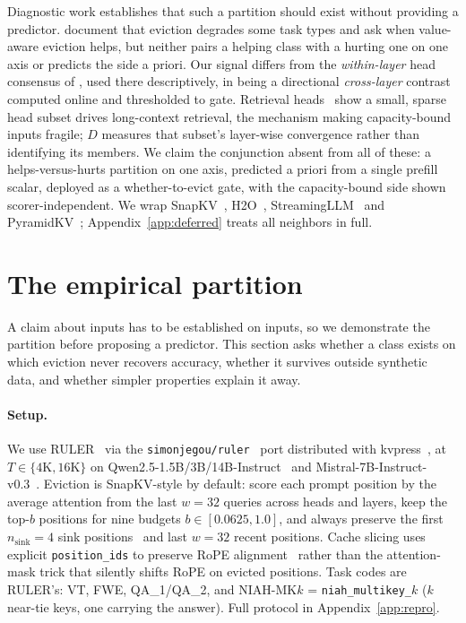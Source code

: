 \documentclass{article}
\begin{document}
Diagnostic work establishes that such a partition should exist without
providing a predictor. \citet{arxiv251000231} document that eviction degrades
some task types and \citet{arxiv260508234} ask when value-aware eviction
helps, but neither pairs a helping class with a hurting one on one axis or
predicts the side a priori. Our signal differs from the \emph{within-layer}
head consensus of \citet{arxiv260301426}, used there descriptively, in being a
directional \emph{cross-layer} contrast computed online and thresholded to
gate. Retrieval heads~\citep{wu2025retrieval} show a small, sparse head subset
drives long-context retrieval, the mechanism making capacity-bound inputs
fragile; $D$ measures that subset's layer-wise convergence rather than
identifying its members. We claim the conjunction absent from all of these: a
helps-versus-hurts partition on one axis, predicted a priori from a single
prefill scalar, deployed as a whether-to-evict gate, with the capacity-bound
side shown scorer-independent. We wrap SnapKV~\citep{arxiv240414469},
H2O~\citep{arxiv230614048}, StreamingLLM~\citep{arxiv230917453} and
PyramidKV~\citep{arxiv240602069}; Appendix~\ref{app:deferred} treats all
neighbors in full.

\section{The empirical partition}
\label{sec:partition}

A claim about inputs has to be established on inputs, so we demonstrate the
partition before proposing a predictor. This section asks whether a class
exists on which eviction never recovers accuracy, whether it survives outside
synthetic data, and whether simpler properties explain it away.

\paragraph{Setup.} We use RULER~\citep{arxiv240406654} via the
\texttt{simonjegou/ruler}~\citep{ruler-hf} port distributed with
kvpress~\citep{kvpress}, at $T \in \{4\mathrm{K}, 16\mathrm{K}\}$ on
Qwen2.5-1.5B/3B/14B-Instruct~\citep{arxiv241215115} and
Mistral-7B-Instruct-v0.3~\citep{arxiv231006825}. Eviction is SnapKV-style by
default: score each prompt position by the average attention from the last $w
= 32$ queries across heads and layers, keep the top-$b$ positions for nine
budgets $b \in [0.0625, 1.0]$, and always preserve the first $n_{\text{sink}}
= 4$ sink positions~\citep{arxiv230917453} and last $w = 32$ recent positions.
Cache slicing uses explicit \texttt{position\_ids} to preserve RoPE
alignment~\citep{roformer} rather than the attention-mask trick that silently
shifts RoPE on evicted positions. Task codes are RULER's: VT, FWE,
QA\_1/QA\_2, and NIAH-MK$k$ = \texttt{niah\_multikey\_}$k$ ($k$ near-tie keys,
one carrying the answer). Full protocol in Appendix~\ref{app:repro}.
\end{document}
